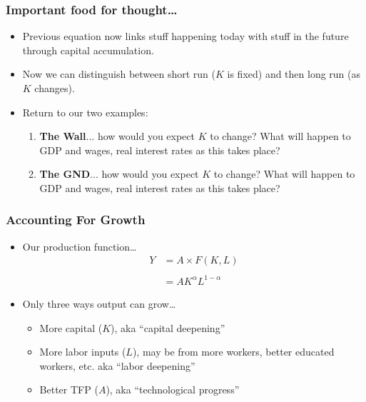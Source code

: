 \documentclass[handout]{beamer}
\begin{document}

\begin{frame}[t]
\frametitle{Important food for thought\ldots}
\footnotesize
\begin{itemize}
\item Previous equation now links stuff happening today with stuff in the future through capital accumulation.
\medskip
\item Now we can distinguish between short run ($K$ is fixed) and then long run (as $K$ changes).
\medskip
\item Return to our two examples: 
\begin{enumerate}
\footnotesize
\smallskip
\item \textbf{The Wall}... how would you expect $K$ to change? What will happen to GDP and wages, real interest rates as this takes place?
\medskip
\medskip
\item \textbf{The GND}... how would you expect $K$ to change? What will happen to GDP and wages, real interest rates as this takes place?
\end{enumerate}
\end{itemize}
\end{frame}



\begin{frame}[t]
\frametitle{Accounting For Growth}
\begin{itemize}
\item Our production function\ldots
\begin{eqnarray*}
Y &= A \times F(K,L)\\
\\
 &=  A K^{\alpha}L^{1-\alpha}
\end{eqnarray*}
\item Only three ways output can grow\ldots
\begin{itemize}
\bigskip
\item More capital ($K$), aka ``capital deepening''
\bigskip
\item More labor inputs ($L$), may be from more workers, better educated workers, etc. aka ``labor deepening''
\bigskip
\item Better TFP ($A$), aka ``technological progress''
\end{itemize}
\end{itemize}
\end{frame}
\end{document}
